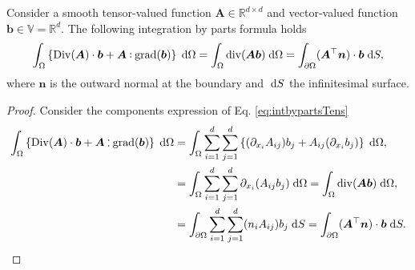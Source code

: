 \begin{theorem}\label{th:greenTens}
Consider a smooth tensor-valued function $\bm{A} \in \mathbb{R}^{d\times d}$ and vector-valued function $\bm{b} \in \mathbb{V}=\mathbb{R}^d$. The following integration by parts formula holds
\begin{equation}\label{eq:intbypartsTens}
\int_{\Omega} \left\{\Div(\bm{A}) \cdot \bm{b} + \bm{A} \cddot \grad(\bm{b}) \right\}  \d{\Omega} = \int_{\Omega} \div(\bm{A} \bm{b}) \d{\Omega} = \int_{\partial\Omega} (\bm{A}^\top \bm{n}) \cdot \bm{b} \d{S},
\end{equation}
where $\bm{n}$ is the outward normal at the boundary and $\d{S}$ the infinitesimal surface.
\begin{proof}
	Consider the components expression of Eq. \eqref{eq:intbypartsTens}
	\begin{equation}
	\begin{aligned}
	\int_{\Omega} \left\{\Div(\bm{A}) \cdot \bm{b} + \bm{A} \cddot \grad(\bm{b}) \right\}  \d{\Omega} &=\int_{\Omega} \sum_{i=1}^{d}\sum_{j = 1}^{d}\left\{(\partial_{x_i}{A}_{ij}){b}_j + {A}_{ij} (\partial_{x_i}{b}_j) \right\}  \d{\Omega}, \\
	&= \int_{\Omega} \sum_{i=1}^{d}\sum_{j = 1}^{d}\partial_{x_i}({A}_{ij} {b}_j) \d{\Omega} = \int_{\Omega} \div(\bm{A} \bm{b}) \d{\Omega}, \\
	&= \int_{\partial\Omega} \sum_{i=1}^{d}\sum_{j = 1}^{d} (n_i A_{ij}) {b}_j \d{S} = \int_{\partial\Omega} (\bm{A}^\top \bm{n}) \cdot \bm{b} \d{S}.
	\end{aligned}
	\end{equation}
\end{proof} 
\end{theorem}

